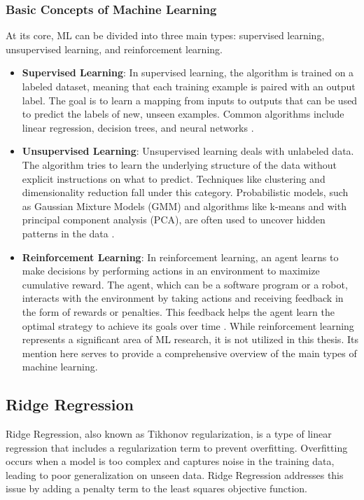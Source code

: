 \documentclass[english,11pt,a4paper,titlepage]{article}
\begin{document}
	\subsubsection*{Basic Concepts of Machine Learning}
	At its core, ML can be divided into three main types: supervised learning, unsupervised learning, and reinforcement learning.
	\begin{itemize}
		\item \textbf{Supervised Learning}: In supervised learning, the algorithm is trained on a labeled dataset, meaning that each training example is paired with an output label. The goal is to learn a mapping from inputs to outputs that can be used to predict the labels of new, unseen examples. Common algorithms include linear regression, decision trees, and neural networks \cite{jordanMachineLearningTrends2015}.
		\item \textbf{Unsupervised Learning}: Unsupervised learning deals with unlabeled data. The algorithm tries to learn the underlying structure of the data without explicit instructions on what to predict. Techniques like clustering and dimensionality reduction fall under this category. Probabilistic models, such as Gaussian Mixture Models (GMM) and algorithms like k-means and with principal component analysis (PCA), are often used to uncover hidden patterns in the data \cite{ghahramaniProbabilisticMachineLearning2015}.
		\item \textbf{Reinforcement Learning}: In reinforcement learning, an agent learns to make decisions by performing actions in an environment to maximize cumulative reward. The agent, which can be a software program or a robot, interacts with the environment by taking actions and receiving feedback in the form of rewards or penalties. This feedback helps the agent learn the optimal strategy to achieve its goals over time \cite{suttonReinforcementLearningIntroduction}. While reinforcement learning represents a significant area of ML research, it is not utilized in this thesis. Its mention here serves to provide a comprehensive overview of the main types of machine learning.
	\end{itemize}
	
	\subsection*{Ridge Regression}
	Ridge Regression, also known as Tikhonov regularization, is a type of linear regression that includes a regularization term to prevent overfitting. Overfitting occurs when a model is too complex and captures noise in the training data, leading to poor generalization on unseen data. Ridge Regression addresses this issue by adding a penalty term to the least squares objective function.
	
\end{document}
